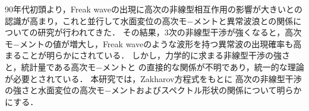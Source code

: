 \documentclass[a4,11pt]{jarticle}
\begin{document}
\setlength{\baselineskip}{5.2mm}
90年代初頭より，Freak waveの出現に高次の非線型相互作用の影響が大きいとの
認識が高まり，これと並行して水面変位の高次モ−メントと異常波浪との関係に
ついての研究が行われてきた．
その結果，3次の非線型干渉が強くなると，高次モ−メントの値が増大し，Freak
waveのような波形を持つ異常波の出現確率も高まることが明らかにされている．
しかし，力学的に求まる非線型干渉の強さと，統計量である高次モ−メントと
の直接的な関係が不明であり，統一的な理論が必要とされている．
本研究では，Zakharov方程式をもとに
高次の非線型干渉の強さと水面変位の高次モ−メントおよびスペクトル形状の関係について明らかにする．
\end{document}
